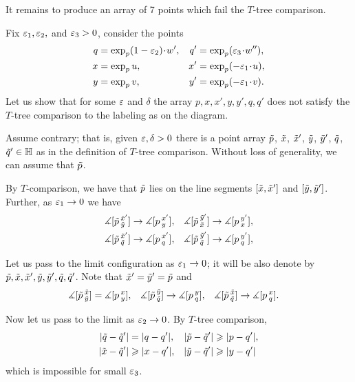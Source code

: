 \begin{wrapfigure}{r}{26 mm}
\end{wrapfigure}

It remains to produce an array of 7 points which fail the $T$-tree comparison.

Fix $\eps_1,\eps_2,$ and $\eps_3>0$, consider the points
\begin{align*}
q&=\exp_p(1-\eps_2)\cdot w',
&
q'&=\exp_p(\eps_3\cdot w''),
\\
x&=\exp_p u,
&
x'&=\exp_p (-\eps_1\cdot u),
\\
y&=\exp_p v,
&
y'&=\exp_p (-\eps_1\cdot v).
\end{align*}
Let us show that for some $\eps$ and $\delta$ the array $p,x,x',y,y',q,q'$ does not satisfy the $T$-tree comparison to the labeling as on the diagram.

Assume contrary; that is, given $\eps,\delta>0$ there is a point array $\~p$, $\~x$, $\~x'$, $\~y$, $\~y'$, $\~q$, $\~q'\in\HH$ as in the definition of $T$-tree comparison.
Without loss of generality, we can assume that $\~p$.

By $T$-comparison, we have that $\~p$ lies on the line segments $[\~x,\~x']$ and $[\~y,\~y']$.
Further, as $\eps_1\to 0$ we have 
\begin{align*}
\measuredangle[\~p\,^{\~x'}_{\~y}]&\to \measuredangle[p\,^{x'}_{y}],
&
\measuredangle[\~p\,^{\~y'}_{\~x}]&\to \measuredangle[p\,^{y'}_{x}],
\\
\measuredangle[\~p\,^{\~x'}_{\~q}]&\to \measuredangle[p\,^{x'}_{q}],
&
\measuredangle[\~p\,^{\~y'}_{\~q}]&\to \measuredangle[p\,^{y'}_{q}],
\end{align*}

Let us pass to the limit configuration as $\eps_1\to0$;
it will be also denote by $\~p,\~x,\~x',\~y,\~y',\~q,\~q'$.
Note that $\~x'=\~y'=\~p$ and 
\begin{align*}
\measuredangle[\~p\,^{\~x}_{\~y}]&= \measuredangle[p\,^{x}_{y}],
&
\measuredangle[\~p\,^{\~y}_{\~q}]&\to \measuredangle[p\,^{y}_{q}],
&
\measuredangle[\~p\,^{\~x}_{\~q}]&\to \measuredangle[p\,^{x}_{q}].
\end{align*}

Now let us pass to the limit as $\eps_2\to0$.
By $T$-tree comparison,
\begin{align*}
|\~q-\~q'|&=|q-q'|,
&
|\~p-\~q'|&\ge |p-q'|,
\\
|\~x-\~q'|&\ge |x-q'|,
&
|\~y-\~q'|&\ge |y-q'|
\end{align*}
which is impossible for small $\eps_3$. %
\qeds




